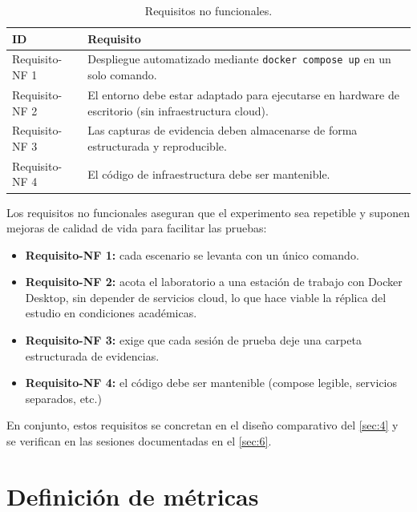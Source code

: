 \documentclass[11pt,spanish,listoffigures,listoftables]{tfgetsinf}
\begin{document}
        \begin{table}[ht]
          \centering
          \label{tab:requisitos-no-funcionales}
          \begin{tabular}{p{2.8cm} p{10cm}}
            \textbf{ID} & \textbf{Requisito} \\
            \midrule
            Requisito-NF 1 & Despliegue automatizado mediante \texttt{docker compose up} en un solo comando. \\
            \midrule
            Requisito-NF 2 & El entorno debe estar adaptado para ejecutarse en hardware de escritorio (sin infraestructura cloud). \\
            \midrule
            Requisito-NF 3 & Las capturas de evidencia deben almacenarse de forma estructurada y reproducible. \\
            \midrule
            Requisito-NF 4 & El código de infraestructura debe ser mantenible. \\
            \bottomrule
          \end{tabular}
          \caption{Requisitos no funcionales.}
        \end{table}
        
        Los requisitos no funcionales aseguran que el experimento sea repetible y suponen mejoras de calidad de vida para facilitar las pruebas:
        \begin{itemize}
            \item \textbf{Requisito-NF 1:} cada escenario se levanta con un único comando.
            \item \textbf{Requisito-NF 2:} acota el laboratorio a una estación de trabajo con Docker Desktop, sin depender de servicios cloud, lo que hace viable la réplica del estudio en condiciones académicas.
            \item \textbf{Requisito-NF 3:} exige que cada sesión de prueba deje una carpeta estructurada de evidencias.
            \item \textbf{Requisito-NF 4:} el código debe ser mantenible (compose legible, servicios separados, etc.)
        \end{itemize}
        En conjunto, estos requisitos se concretan en el diseño comparativo del \cref{sec:4} y se verifican en las sesiones documentadas en el \cref{sec:6}.
        
    \section{Definición de métricas}
    \label{sec:3.4}
    
\end{document}
